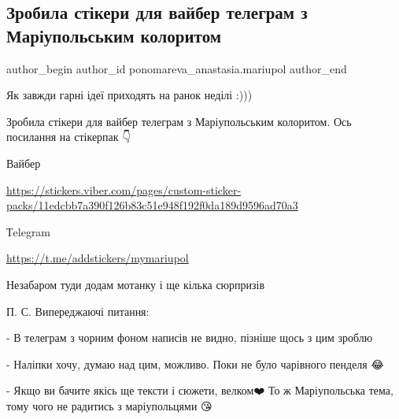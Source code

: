  
 
 
 
 

\subsection{Зробила стікери для вайбер телеграм  з Маріупольським колоритом}
\label{sec:26_03_2023.fb.ponomareva_anastasia.mariupol.1.zrobila_st_keri_dlya}

\ifcmt
 author_begin
   author_id ponomareva_anastasia.mariupol
 author_end
\fi

Як завжди гарні ідеї приходять на ранок неділі :)))

Зробила стікери для вайбер телеграм  з Маріупольським колоритом. Ось посилання на стікерпак 👇

Вайбер

\url{https://stickers.viber.com/pages/custom-sticker-packs/11edcbb7a390f126b83c51e948f192f0da189d9596ad70a3}

Тelegram 

\url{https://t.me/addstickers/mymariupol}

Незабаром туди додам мотанку і ще кілька сюрпризів 🥰

П. С. Випереджаючі питання:

- В телеграм з чорним фоном написів не видно, пізніше щось з цим зроблю

- Наліпки хочу, думаю над цим, можливо. Поки не було чарівного пенделя 😂

- Якщо ви бачите якісь ще тексти і сюжети, велком❤️ То  ж Маріупольська тема,
тому чого не радитись з маріупольцями 😘

